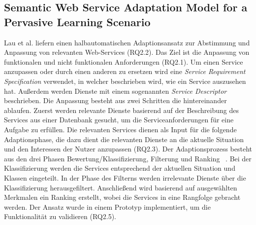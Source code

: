 \documentclass[conference,compsoc]{IEEEtran}
\begin{document}
\subsection{Semantic Web Service Adaptation Model for a Pervasive Learning Scenario}
Lau et al.\cite{lau2008semantic} liefern einen halbautomatischen Adaptionsansatz zur Abstimmung und Anpassung von relevanten Web-Services (RQ2.2). Das Ziel ist die Anpassung von funktionalen und nicht funktionalen Anforderungen (RQ2.1). Um einen Service anzupassen oder durch einen anderen zu ersetzen wird eine \textit{Service Requirement Specification} verwendet, in welcher beschrieben wird, wie ein Service auszusehen hat. Außerdem werden Dienste mit einem sogenannten \textit{Service Descriptor} beschrieben. Die Anpassung besteht aus zwei Schritten die hintereinander ablaufen. Zuerst werden relevante Dienste basierend auf der Beschreibung des Services aus einer Datenbank gesucht, um die Serviceanforderungen für eine Aufgabe zu erfüllen. Die relevanten Services dienen als Input für die folgende Adaptionsphase, die dazu dient die relevanten Dienste an die aktuelle Situation und den Interessen der Nutzer anzupassen (RQ2.3). Der Adaptionsprozess besteht aus den drei Phasen Bewertung/Klassifizierung, Filterung und Ranking ~\cite{lau2008semantic}. Bei der Klassifizierung werden die Services entsprechend der aktuellen Situation und Klassen eingeteilt. In der Phase des Filterns werden irrelevante Dienste über die Klassifizierung herausgefiltert. Anschließend wird basierend auf ausgewählten Merkmalen ein Ranking erstellt, wobei die Services in eine Rangfolge gebracht werden.
Der Ansatz wurde in einem Prototyp implementiert, um die Funktionalität zu validieren (RQ2.5).
\end{document}
